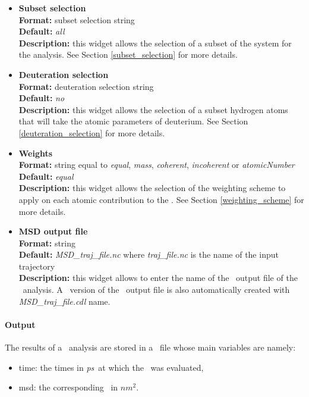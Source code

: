 \documentclass[a4paper,11pt]{report}
\newcommand{\nmsquare}{$nm^2$}
\newcommand{\ps}{\textit{ps}}
\begin{document}
\begin{itemize}
\hypertarget{msd_subset_selection}{}
\item \textbf{Subset selection}\\
\textbf{Format:} subset selection string\\
\textbf{Default:} \textit{all}\\
\textbf{Description:} this widget allows the selection of a subset of the system for the analysis. 
See Section \ref{subset_selection} for more details.

\hypertarget{msd_deuteration_selection}{}
\item \textbf{Deuteration selection}\\
\textbf{Format:} deuteration selection string\\
\textbf{Default:} \textit{no}\\
\textbf{Description:} this widget allows the selection of a subset hydrogen atoms that will take the atomic parameters 
of deuterium. See Section \ref{deuteration_selection} for more details.

\hypertarget{msd_weights}{}
\item \textbf{Weights}\\
\textbf{Format:} string equal to \textit{equal}, \textit{mass}, \textit{coherent}, \textit{incoherent} or \textit{atomicNumber}\\
\textbf{Default:} \textit{equal}\\
\textbf{Description:} this widget allows the selection of the weighting scheme to apply on each atomic contribution 
to the \MSD . See Section \ref{weighting_scheme} for more details. 

\hypertarget{msd_msd_output_file}{}
\item \textbf{MSD output file}\\
\textbf{Format:} string\\
\textbf{Default:} \textit{MSD\_traj\_file.nc} where \textit{traj\_file.nc} is the name of the input trajectory\\
\textbf{Description:} this widget allows to enter the name of the \NetCDF\ output file of the \MSD\ analysis. A \CDL\ 
version of the \NetCDF\ output file is also automatically created with \textit{MSD\_traj\_file.cdl} name.
\end{itemize}

\paragraph{Output\\}
The results of a \MSD\ analysis are stored in a \NetCDF\ file whose main variables are namely:
\begin{itemize}
\item time: the times in \ps\ at which the \MSD\ was evaluated,
\item msd: the corresponding \MSD\ in \nmsquare .
\end{itemize}
\end{document}
